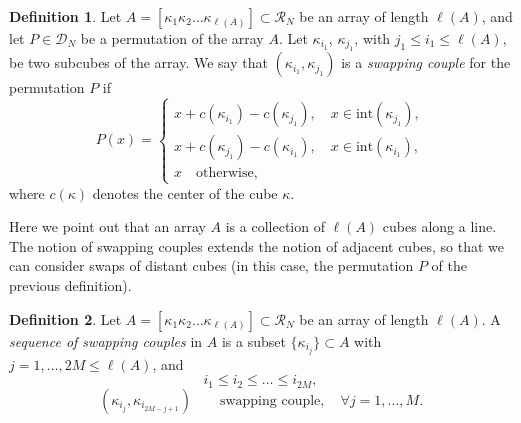 \documentclass[12 pt]{article}
\theoremstyle{definition} \newtheorem{definition}{Definition}[section]
\theoremstyle{definition} \newtheorem{remark}[definition]{Remark}
\theoremstyle{plain} \newtheorem{lemma}[definition]{Lemma}
\theoremstyle{plain} \newtheorem{proposition}[definition]{Proposition}
\theoremstyle{plain} \newtheorem{theorem}[definition]{Theorem}
\theoremstyle{plain} \newtheorem{corollary}[definition]{Corollary}
\theoremstyle{definition} \newtheorem{example}[definition]{Example}
\theoremstyle{definition} \newtheorem{assumption}[definition]{Assumption}
\theoremstyle{definition} \newtheorem{conjecture}[definition]{Conjecture}
\newcommand{\1}{\mathbbm 1}
\numberwithin{equation}{section}
\begin{document}
\begin{definition}\label{def:Exchanging:couple}
   Let $A=[\kappa_1 \kappa_2 \dots \kappa_{\ell(A)}]\subset\mathcal{R}_N$ be an array of length $\ell(A)$, and let $P\in\mathcal{D}_N$ be a permutation of the array $A$. Let $\kappa_{i_1}$, $\kappa_{j_1}$, with $j_1\leq i_1\leq \ell(A)$, be two subcubes of the array. We say that $(\kappa_{i_1},\kappa_{j_1})$ is a \emph{swapping couple}  for the permutation $P$ if
   \begin{equation*}
       P(x)=\begin{cases}
           x+c(\kappa_{i_1})-c(\kappa_{j_1}), \quad x\in \text{int}(\kappa_{j_1}), \\
           x+c(\kappa_{j_1})-c(\kappa_{i_1}), \quad x\in \text{int}(\kappa_{i_1}),\\
           x \quad\text{otherwise},
       \end{cases}
   \end{equation*}
   where $c(\kappa)$ denotes the center of the cube $\kappa$.
\end{definition}
Here we point out that an array $A$ is a collection of $\ell(A)$ cubes along a line. 
The notion of swapping couples extends the notion of adjacent cubes, so that we can consider swaps of distant cubes (in this case, the permutation $P$ of the previous definition).
\begin{definition}\label{def:sequence:swapping:couple}
    Let $A=[\kappa_1 \kappa_2 \dots \kappa_{\ell(A)}]\subset\mathcal{R}_N$ be an array of length $\ell(A)$. A \emph{sequence of swapping couples} in $A$ is a subset $\lbrace \kappa_{i_j}\rbrace\subset A$ with $j=1,\dots,2M\leq\ell(A)$, and
    \begin{equation*}
    i_1\leq i_2\leq\dots  \leq i_{2M},
    \end{equation*}
    \begin{equation*}
(\kappa_{i_j},\kappa_{i_{2M-j+1}})\qquad\text{swapping couple},\quad\forall j=1,\dots,M.
    \end{equation*}
    
\end{definition}
\end{document}
